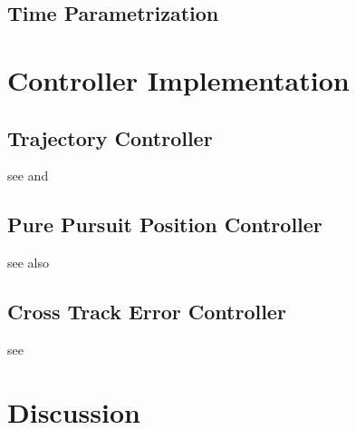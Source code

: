 \subsection{Time Parametrization}

\section{Controller Implementation}
\label{sec:controllerImplementation}
\subsection{Trajectory Controller}
see \cite{snider} and \cite{deluca}
\subsection{Pure Pursuit Position Controller}
see also \cite{snider}
\subsection{Cross Track Error Controller}
see \cite{williams}

\section{Discussion}
\label{sec:discussion}

